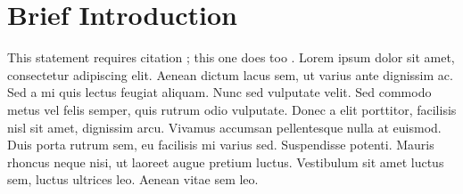 \documentclass[12pt]{diazessay} %
\begin{document}



\vspace{30pt} %


\section{Brief Introduction}

This statement requires citation \cite{fibration2019}; this one does too \cite{Cardon1982} \cite{Boldi2006} \cite{Tarjan1987} \cite{Stewart2006}. Lorem ipsum dolor sit amet, consectetur adipiscing elit. Aenean dictum lacus sem, ut varius ante dignissim ac. Sed a mi quis lectus feugiat aliquam. Nunc sed vulputate velit. Sed commodo metus vel felis semper, quis rutrum odio vulputate. Donec a elit porttitor, facilisis nisl sit amet, dignissim arcu. Vivamus accumsan pellentesque nulla at euismod. Duis porta rutrum sem, eu facilisis mi varius sed. Suspendisse potenti. Mauris rhoncus neque nisi, ut laoreet augue pretium luctus. Vestibulum sit amet luctus sem, luctus ultrices leo. Aenean vitae sem leo.
\end{document}

